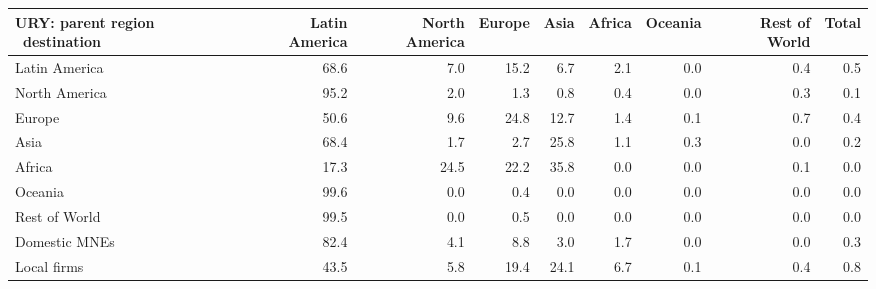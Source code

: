 \begin{tabular}{lrrrrrrrr}
\toprule
URY: parent region \ destination & Latin America & North America & Europe & Asia & Africa & Oceania & Rest of World & Total \\
\midrule
Latin America & 68.6 & 7.0 & 15.2 & 6.7 & 2.1 & 0.0 & 0.4 & 0.5 \\
North America & 95.2 & 2.0 & 1.3 & 0.8 & 0.4 & 0.0 & 0.3 & 0.1 \\
Europe & 50.6 & 9.6 & 24.8 & 12.7 & 1.4 & 0.1 & 0.7 & 0.4 \\
Asia & 68.4 & 1.7 & 2.7 & 25.8 & 1.1 & 0.3 & 0.0 & 0.2 \\
Africa & 17.3 & 24.5 & 22.2 & 35.8 & 0.0 & 0.0 & 0.1 & 0.0 \\
Oceania & 99.6 & 0.0 & 0.4 & 0.0 & 0.0 & 0.0 & 0.0 & 0.0 \\
Rest of World & 99.5 & 0.0 & 0.5 & 0.0 & 0.0 & 0.0 & 0.0 & 0.0 \\
Domestic MNEs & 82.4 & 4.1 & 8.8 & 3.0 & 1.7 & 0.0 & 0.0 & 0.3 \\
Local firms & 43.5 & 5.8 & 19.4 & 24.1 & 6.7 & 0.1 & 0.4 & 0.8 \\
\bottomrule
\end{tabular}
